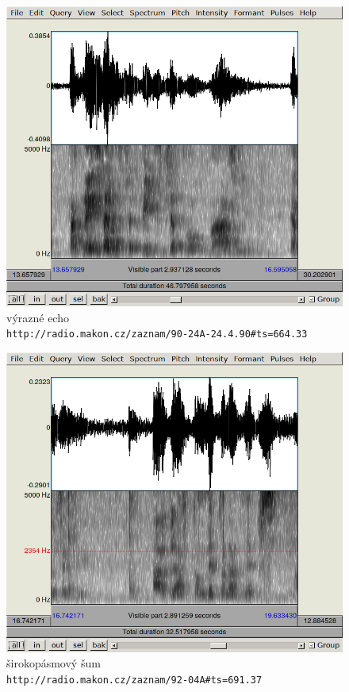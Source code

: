 \begin{figure}[htpb]
\includegraphics[scale=0.89]{rc/spectrum-echo-90-24A.png}
\caption{
    výrazné echo\\
    \texttt{http://radio.makon.cz/zaznam/90-24A-24.4.90\#ts=664.33}
}
\label{fig:spectr-echo}
\end{figure}

\begin{figure}[htpb]
\includegraphics[scale=0.89]{rc/spectrum-noise-92-04A.png}
\caption{
    širokopásmový šum\\
    \texttt{http://radio.makon.cz/zaznam/92-04A\#ts=691.37}
}
\label{fig:spectr-noise}
\end{figure}


